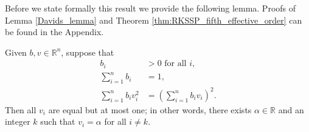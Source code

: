 Before we state formally this result we provide the following lemma. Proofs of Lemma \ref{Davids_lemma} and Theorem \ref{thm:RKSSP_fifth_effective_order} can be found in the Appendix.
\begin{lemma}\label{Davids_lemma}
	Given $b,v \in \mathbb{R}^{n}$, suppose that
    \begin{subequations}\label{eq:DavidsLemma}
    		\begin{align}
    			b_i & > 0 \mbox{ for all } i, \label{eq:DavidsLemma_a} \\
    			\sum_{i=1}^n b_i & = 1, \label{eq:DavidsLemma_b} \\
    			\sum_{i=1}^n b_i v_i^2 & = \left(\sum_{i=1}^n b_i v_i \right)^2. \label{eq:DavidsLemma_c}
    		\end{align}
    	\end{subequations}
    	Then all $v_i$ are equal but at most one; in other words, there exists $\alpha \in \mathbb{R}$ and an integer $k$ such that $v_i = \alpha$ for all $i \ne k$.
\end{lemma}
